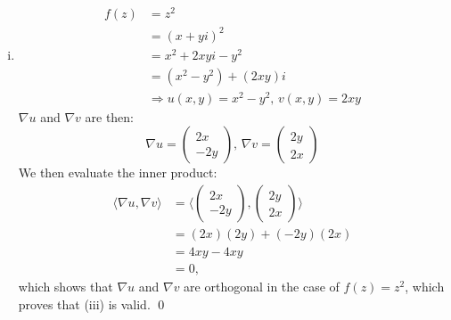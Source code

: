 \documentclass[a4paper, titlepage, DIV=14]{scrartcl}
\begin{document}
\begin{enumerate}[(i)]
        \item 
        \begin{align*}
            f(z) &= z^{2} \\
                &= (x + yi)^{2} \\
                &= x^{2} + 2xyi - y^{2} \\
                &= (x^{2}-y^{2}) + (2xy)i \\
                &\Rightarrow u(x,y) = x^{2}-y^{2}, \, v(x,y) = 2xy
        \end{align*}
        $\nabla u$ and $\nabla v$ are then:
        \begin{equation*}
            \nabla u = 
            \begin{pmatrix}
                2x \\
                -2y   
            \end{pmatrix}, \,
            \nabla v = 
            \begin{pmatrix}
                2y \\
                2x  
            \end{pmatrix}
        \end{equation*}
        We then evaluate the inner product:
        \begin{align*}
            \langle \nabla u, \nabla v \rangle &= \langle 
            \begin{pmatrix}
                2x \\
                -2y 
            \end{pmatrix}, 
            \begin{pmatrix}
                2y \\
                2x     
            \end{pmatrix} 
            \rangle \\
            &= (2x)(2y) + (-2y)(2x) \\
            &= 4xy - 4xy \\
            &= 0,
        \end{align*} which shows that $\nabla u$ and $\nabla v$ are orthogonal in the case of 
        $f(z)=z^{2}$, which proves that (iii) is valid. \qed
    \end{enumerate}
\end{document}

